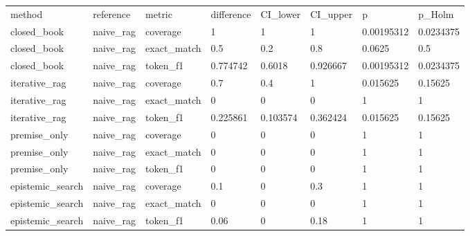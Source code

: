 \begin{tabular}{llllllll}
\hline
method & reference & metric & difference & CI\_lower & CI\_upper & p & p\_Holm \\
closed\_book & naive\_rag & coverage & 1 & 1 & 1 & 0.00195312 & 0.0234375 \\
closed\_book & naive\_rag & exact\_match & 0.5 & 0.2 & 0.8 & 0.0625 & 0.5 \\
closed\_book & naive\_rag & token\_f1 & 0.774742 & 0.6018 & 0.926667 & 0.00195312 & 0.0234375 \\
iterative\_rag & naive\_rag & coverage & 0.7 & 0.4 & 1 & 0.015625 & 0.15625 \\
iterative\_rag & naive\_rag & exact\_match & 0 & 0 & 0 & 1 & 1 \\
iterative\_rag & naive\_rag & token\_f1 & 0.225861 & 0.103574 & 0.362424 & 0.015625 & 0.15625 \\
premise\_only & naive\_rag & coverage & 0 & 0 & 0 & 1 & 1 \\
premise\_only & naive\_rag & exact\_match & 0 & 0 & 0 & 1 & 1 \\
premise\_only & naive\_rag & token\_f1 & 0 & 0 & 0 & 1 & 1 \\
epistemic\_search & naive\_rag & coverage & 0.1 & 0 & 0.3 & 1 & 1 \\
epistemic\_search & naive\_rag & exact\_match & 0 & 0 & 0 & 1 & 1 \\
epistemic\_search & naive\_rag & token\_f1 & 0.06 & 0 & 0.18 & 1 & 1 \\
\hline
\end{tabular}
